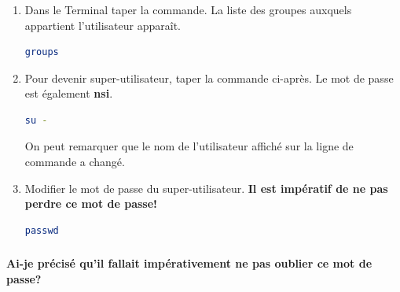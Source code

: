 \documentclass[svgnames,11pt]{beamer}
\begin{document}
\begin{frame}[fragile]
    \frametitle{}

    \begin{activite}
\begin{enumerate}
\item Dans le Terminal taper la commande. La liste des groupes auxquels appartient l'utilisateur apparaît.
\begin{lstlisting}[language=bash, basicstyle=\ttfamily\small, xleftmargin=2em, xrightmargin=2em]
groups
\end{lstlisting}
\item Pour devenir super-utilisateur, taper la commande ci-après. Le mot de passe est également \textbf{nsi}.
\begin{lstlisting}[language=bash, basicstyle=\ttfamily\small, xleftmargin=2em, xrightmargin=2em]
su -
\end{lstlisting}
On peut remarquer que le nom de l'utilisateur affiché sur la ligne de commande a changé.
\item Modifier le mot de passe du super-utilisateur. \textbf{Il est impératif de ne pas perdre ce mot de passe!}
\begin{lstlisting}[language=bash, basicstyle=\ttfamily\small, xleftmargin=2em, xrightmargin=2em]
passwd
\end{lstlisting}
\end{enumerate}
\end{activite}

\end{frame}
\begin{frame}
    \frametitle{}

    \begin{framed}
        \centering \textbf{Ai-je précisé qu'il fallait impérativement ne pas oublier ce mot de passe?}
    \end{framed}

\end{frame}
\end{document}
